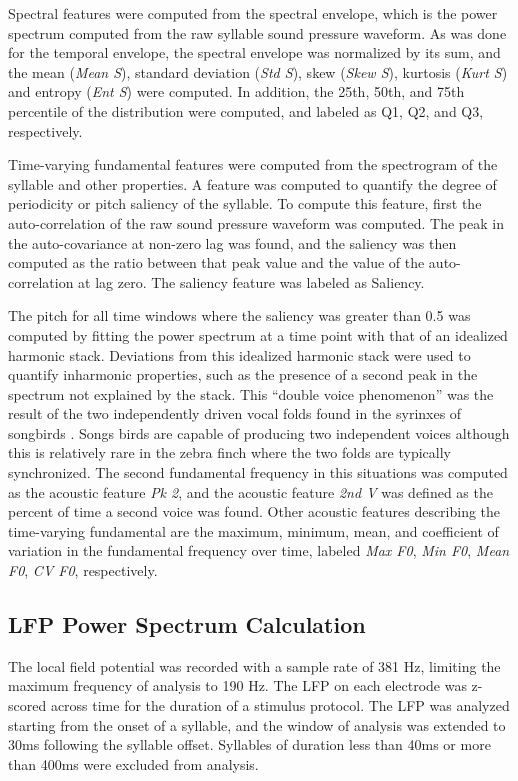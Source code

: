 Spectral features were computed from the spectral envelope, which is the power spectrum computed from the raw syllable sound pressure waveform. As was done for the temporal envelope, the spectral envelope was normalized by its sum, and the mean ({\em Mean S}), standard deviation ({\em Std S}), skew ({\em Skew S}), kurtosis ({\em Kurt S}) and entropy ({\em Ent S}) were computed. In addition, the 25th, 50th, and 75th percentile of the distribution were computed, and labeled as Q1, Q2, and Q3, respectively.

Time-varying fundamental features were computed from the spectrogram of the syllable and other properties. A feature was computed to quantify the degree of periodicity or pitch saliency of the syllable. To compute this feature, first the auto-correlation of the raw sound pressure waveform was computed. The peak in the auto-covariance at non-zero lag was found, and the saliency was then computed as the ratio between that peak value and the value of the auto-correlation at lag zero. The saliency feature was labeled as Saliency.

    The pitch for all time windows where the saliency was greater than 0.5 was computed by fitting the power spectrum at a time point with that of an idealized harmonic stack. Deviations from this idealized harmonic stack were used to quantify inharmonic properties, such as the presence of a second peak in the spectrum not explained by the stack. This ``double voice phenomenon'' was the result of the two independently driven vocal folds found in the syrinxes of songbirds \cite{Suthers1994}. Songs birds are capable of producing two independent voices although this is relatively rare in the zebra finch where the two folds are typically synchronized. The second fundamental frequency in this situations was computed as the acoustic feature {\em Pk 2}, and the acoustic feature {\em 2nd V} was defined as the percent of time a second voice was found. Other acoustic features describing the time-varying fundamental are the maximum, minimum, mean, and coefficient of variation in the fundamental frequency over time, labeled {\em Max F0}, {\em Min F0}, {\em Mean F0}, {\em CV F0}, respectively.


\subsection{LFP Power Spectrum Calculation}
    
    The local field potential was recorded with a sample rate of 381 Hz, limiting the maximum frequency of analysis to 190 Hz. The LFP on each electrode was z-scored across time for the duration of a stimulus protocol. The LFP was analyzed starting from the onset of a syllable, and the window of analysis was extended to 30ms following the syllable offset. Syllables of duration less than 40ms or more than 400ms were excluded from analysis.

